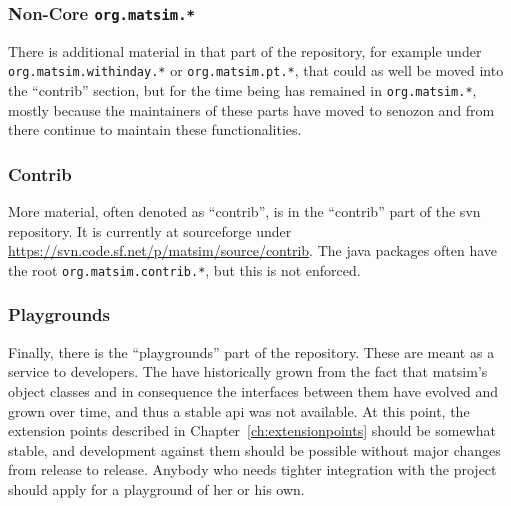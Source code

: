 \subsubsection{Non-Core \lstinline{org.matsim.*}}
There is additional material in that part of the repository, for example under \lstinline{org.matsim.withinday.*} or \lstinline{org.matsim.pt.*}, that could as well be moved into the ``contrib'' section, but for the time being has remained in \lstinline{org.matsim.*}, mostly because the maintainers of these parts have moved to \gls{senozon} and from there continue to maintain these functionalities.

\subsubsection{Contrib}
More material, often denoted as ``contrib'', is in the ``contrib'' part of the \gls{svn} repository.  It is currently at \gls{sourceforge} under \url{https://svn.code.sf.net/p/matsim/source/contrib}.  The \gls{java} packages often have the root \lstinline{org.matsim.contrib.*}, but this is not enforced.


\subsubsection{Playgrounds}
Finally, there is the ``playgrounds'' part of the repository.  These are meant as a service to developers.  The have historically grown from the fact that \gls{matsim}'s object classes and in consequence the interfaces between them have evolved and grown over time, and thus a stable \gls{api} was not available.  At this point, the extension points described in Chapter~\ref{ch:extensionpoints} should be somewhat stable, and development against them should be possible without major changes from release to release.  Anybody who needs tighter integration with the project should apply for a playground of her or his own.  

